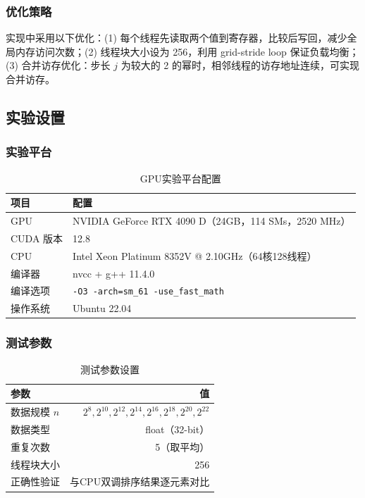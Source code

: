 \documentclass[UTF8,a4paper,10pt]{ctexart}
\begin{document}
\subsubsection{优化策略}

实现中采用以下优化：(1) 每个线程先读取两个值到寄存器，比较后写回，减少全局内存访问次数；(2) 线程块大小设为 256，利用 grid-stride loop 保证负载均衡；(3) 合并访存优化：步长 $j$ 为较大的 2 的幂时，相邻线程的访存地址连续，可实现合并访存。

\subsection{实验设置}

\subsubsection{实验平台}

\begin{table}[H]
\centering
\caption{GPU实验平台配置}
\label{tab:platform}
\begin{tabular}{ll}
\toprule
项目 & 配置 \\
\midrule
GPU & NVIDIA GeForce RTX 4090 D（24GB，114 SMs，2520 MHz） \\
CUDA 版本 & 12.8 \\
CPU & Intel Xeon Platinum 8352V @ 2.10GHz（64核128线程） \\
编译器 & nvcc + g++ 11.4.0 \\
编译选项 & \texttt{-O3 -arch=sm\_61 -use\_fast\_math} \\
操作系统 & Ubuntu 22.04 \\
\bottomrule
\end{tabular}
\end{table}

\subsubsection{测试参数}

\begin{table}[H]
\centering
\caption{测试参数设置}
\label{tab:params}
\begin{tabular}{lr}
\toprule
参数 & 值 \\
\midrule
数据规模 $n$ & $2^8, 2^{10}, 2^{12}, 2^{14}, 2^{16}, 2^{18}, 2^{20}, 2^{22}$ \\
数据类型 & float（32-bit） \\
重复次数 & 5（取平均） \\
线程块大小 & 256 \\
正确性验证 & 与CPU双调排序结果逐元素对比 \\
\bottomrule
\end{tabular}
\end{table}
\end{document}

